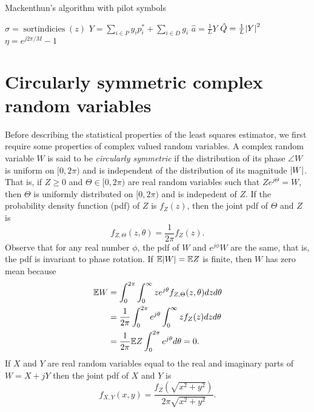 \documentclass[journal]{IEEEtran}
\begin{document}
\begin{algorithm}[t] \label{alg:loglinear}
\SetAlCapFnt{\small}
\SetAlTitleFnt{}
\caption{Mackenthun's algorithm with pilot symbols}
\DontPrintSemicolon
{}
$\sigma = \operatorname{sortindicies}(z)$  \;
$Y = \sum_{i \in P} y_i p_i^* + \sum_{i \in D} g_i $ \;
$\hat{a} = \frac{1}{L} Y$ \;
$\hat{Q} = \frac{1}{L}{\left\vert Y \right\vert}^2$  \;
$\eta = e^{j2\pi/M} - 1$ \;
\end{algorithm}


\section{Circularly symmetric complex random variables}\label{sec:circ-symm-compl}

Before describing the statistical properties of the least squares estimator, we first require some properties of complex valued random variables.  A complex random variable $W$ is said to be \emph{circularly symmetric} if the distribution of its phase $\angle{W}$ is uniform on $[0,2\pi)$ and is independent of the distribution of its magnitude ${\left\vert W \right\vert}$.  That is, if $Z \geq 0$ and $\Theta \in [0,2\pi)$ are real random variables such that $Ze^{j\Theta} = W$, then $\Theta$ is uniformly distributed on $[0,2\pi)$ and is indepedent of $Z$.  If the probability density function (pdf) of $Z$ is $f_Z(z)$, then the joint pdf of $\Theta$ and $Z$ is 
\[
f_{Z,\Theta}(z,\theta) = \frac{1}{2\pi}f_Z(z).
\]
Observe that for any real number $\phi$, the pdf of $W$ and $e^{j\phi}W$ are the same, that is, the pdf is invariant to phase rotation.  If ${\mathbb E}{\left\vert W \right\vert} = {\mathbb E} Z$ is finite, then $W$ has zero mean because
\begin{align*}
 {\mathbb E} W &= \int_{0}^{2\pi} \int_{0}^\infty z e^{j\theta} f_{Z,\Theta}(z,\theta) dz d\theta \\
 &= \frac{1}{2\pi} \int_{0}^{2\pi} e^{j\theta} \int_{0}^\infty z f_Z(z) dz d\theta \\
 &= \frac{1}{2\pi}{\mathbb E} Z \int_{0}^{2\pi} e^{j\theta} d\theta = 0.
 \end{align*}
If $X$ and $Y$ are real random variables equal to the real and imaginary parts of $W = X + jY$ then the joint pdf of $X$ and $Y$ is
\[
f_{X,Y}(x,y) = \frac{f_Z(\sqrt{x^2 + y^2})}{2\pi \sqrt{x^2 + y^2}}.
\]
\end{document}
